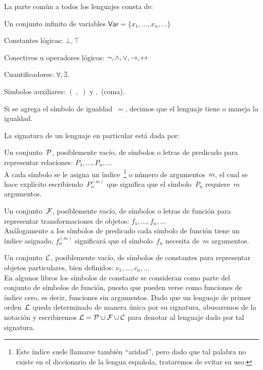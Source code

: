 \documentclass[11pt,letterpaper]{article}
\begin{document}
\smallskip

\noindent La parte común a todos los lenguajes consta de:
\bi
 \item Un conjunto infinito de variables 
  $\mathsf{Var}=\{x_1,\ldots,x_n,\ldots\}$
 \item Constantes lógicas: $\bot,\top$
 \item Conectivos u operadores lógicos: $\neg,\land,\lor,\rightarrow,\leftrightarrow$
 \item Cuantificadores: $\forall,\exists$.
  \item Símbolos auxiliares: $(\;,\;)$ y $,$ (coma).
 \item Si se agrega el símbolo de igualdad~$=$, decimos que el lenguaje tiene o maneja la igualdad.
\ei

\noindent La signatura de un lenguaje en particular está dada por:
\bi
 \item Un conjunto~$\mathcal{P}$, posiblemente vacío, de símbolos o letras de
  predicado para representar relaciones:  $ P_1,\ldots,P_n,\ldots$\\
  A cada símbolo se le asigna un índice~\footnote{Este índice suele llamarse 
  también \enquote{aridad}, pero dado que tal palabra no existe en el 
  diccionario de la lengua española, trataremos de evitar su uso.} o número 
  de argumentos~$m$, el cual se hace explícito escribiendo~$P_n^{(m)}$ que  
  significa que el símbolo~$P_n$ requiere~$m$ argumentos.
  
 \item Un conjunto~$\mathcal{F}$, posiblemente vacío, de símbolos o letras de
  función para representar transformaciones de objetos: $f_1,\ldots,f_n,\ldots$\\ 
  Análogamente a los símbolos de predicado cada símbolo de función tiene un 
  índice asignado, $f_n^{(m)}$ significará que el símbolo~$f_n$ necesita de~$m$ 
  argumentos.   
  
 \item Un conjunto~$\mathcal{C}$, posiblemente vacío, de símbolos de constantes para representar objetos particulares, bien definidos:
  $c_1,\ldots,c_n,\ldots$\\
  En algunos libros los símbolos de constante se consideran como parte del
  conjunto de símbolos de función, puesto que pueden verse como funciones de
  índice cero, es decir, funciones sin argumentos.
\ei
Dado que un lenguaje de primer orden~$\mathcal{L}$ queda determinado de manera única 
por su signatura, abusaremos de la notación y escribiremos $\mathcal{L}=\mathcal{P}\cup\mathcal{F}\cup\mathcal{C}$
para denotar al lenguaje dado por tal signatura.
\end{document}
